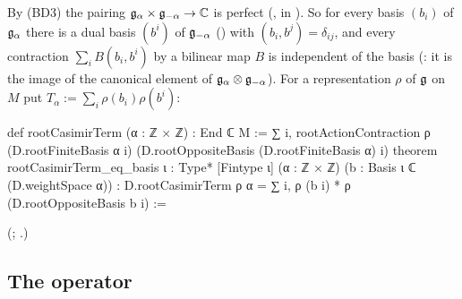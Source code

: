 By (BD3) the pairing $\mathfrak{g}_\alpha\times\mathfrak{g}_{-\alpha}\to\mathbb C$ is perfect (, in
).  So for every basis $(b_i)$ of $\mathfrak{g}_\alpha$ there is a dual basis
$(b^i)$ of $\mathfrak{g}_{-\alpha}$ () with $(b_i,b^j)=\delta_{ij}$, and every contraction
$\sum_iB(b_i,b^i)$ by a bilinear map $B$ is independent of the basis (: it is the
image of the canonical element of $\mathfrak{g}_\alpha\otimes\mathfrak{g}_{-\alpha}$).  For a representation $\rho$ of $\mathfrak{g}$ on $M$ put
$T_\alpha:=\sum_i\rho(b_i)\rho(b^i)$:
\begin{leancode}
def rootCasimirTerm (α : ℤ × ℤ) : End ℂ M :=
  ∑ i, rootActionContraction ρ (D.rootFiniteBasis α i)
    (D.rootOppositeBasis (D.rootFiniteBasis α) i)
theorem rootCasimirTerm_eq_basis {ι : Type*} [Fintype ι] (α : ℤ × ℤ)
    (b : Basis ι ℂ (D.weightSpace α)) :
    D.rootCasimirTerm ρ α = ∑ i, ρ (b i) * ρ (D.rootOppositeBasis b i) :=
\end{leancode}
(; .)

\subsection{The operator}

